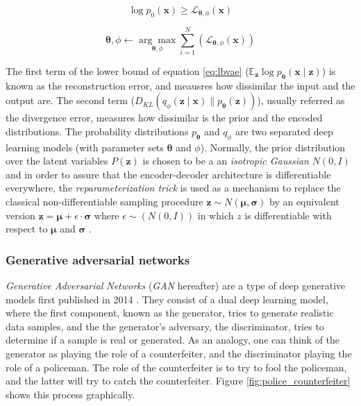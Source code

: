 \begin{equation}
\label{eq:vaelbasloss}
\log p_{0}(\mathbf{x}) \geq \mathcal{L}_{\mathbf{\theta}, \phi}\left(\mathbf{x}\right)
\end{equation}

\begin{equation}
\label{eq:vaeopt}
\mathbf{\theta}, \phi \leftarrow \underset{\mathbf{\theta}, \phi}{\arg \max } \sum_{i=1}^{N}\left(\mathcal{L}_{\mathbf{\theta}, \phi}(\mathbf{x})\right)
\end{equation}

The first term of the lower bound of equation \ref{eq:lbvae} ($\mathbb{E}_{\mathbf{z}} \log p_{\mathbf{\theta}}(\mathbf{x} \mid \mathbf{z})$) is known as the reconstruction error, and meausres how dissimilar the input and the output are. The second term ($D_{K L}\left(q_{\phi}(\mathbf{z} \mid \mathbf{x}) \| p_{\mathbf{\theta}}(\mathbf{z})\right)$), usually referred as the divergence error, measures how dissimilar is the prior and the encoded distributions. The probability distributions $p_\mathbf{\theta}$ and $q_\phi$ are two separated deep learning models (with parameter sets $\mathbf{\theta}$ and $\phi$). Normally, the prior distribution over the latent variables $P(\mathbf{z})$ is chosen to be a an \textit{isotropic Gaussian} $N(0,I)$ \cite{asperti2021, wei2021} and in order to assure that the encoder-decoder architecture is differentiable everywhere, the \textit{reparameterization trick} is used as a mechanism to replace the classical non-differentiable sampling procedure $\mathbf{z} \sim N(\mathbf{\mu}, \mathbf{\sigma})$ by an equivalent version $\mathbf{z} = \mathbf{\mu} + \epsilon \cdot \mathbf{\sigma}$ where $\epsilon \sim (N(0,I))$ in which $z$ is differentiable with respect to $\mathbf{\mu}$ and $\mathbf{\sigma}$ \cite{kingma2019}.


\subsubsection{Generative adversarial networks}
\textit{Generative Adversarial Networks} (\textit{GAN} hereafter) are a type of deep generative models first published in 2014 \cite{Goodfellow2014}. They consist of a dual deep learning model, where the first component, known as the generator, tries to generate realistic data samples, and the the generator's adversary, the discriminator, tries to determine if a sample is real or generated. As an analogy, one can think of the generator as playing the role of a counterfeiter, and the discriminator playing the role of a policeman. The role of the counterfeiter is to try to fool the policeman, and the latter will try to catch the counterfeiter. Figure \ref{fig:police_counterfeiter} shows this process graphically.  

